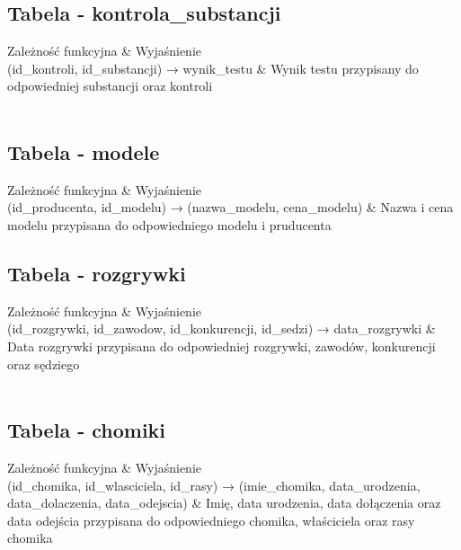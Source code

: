 \documentclass{article}
\begin{document}
\subsection{Tabela - kontrola\_substancji}

\begin{tcolorbox}[tab2,tabularx={X||X}]
Zależność funkcyjna & Wyjaśnienie     \\
\hline
\hline
(id\_kontroli, id\_substancji) → wynik\_testu & Wynik testu przypisany do odpowiedniej substancji oraz kontroli \\  \\    
\end{tcolorbox}

\subsection{Tabela - modele}

\begin{tcolorbox}[tab2,tabularx={X||X}]
Zależność funkcyjna & Wyjaśnienie     \\
\hline
\hline
(id\_producenta, id\_modelu) → (nazwa\_modelu, cena\_modelu) & Nazwa i cena modelu przypisana do odpowiedniego modelu i pruducenta \\ 
\end{tcolorbox}

\subsection{Tabela - rozgrywki}

\begin{tcolorbox}[tab2,tabularx={X||X}]
Zależność funkcyjna & Wyjaśnienie     \\
\hline
\hline
(id\_rozgrywki, id\_zawodow, id\_konkurencji, id\_sedzi) → data\_rozgrywki & Data rozgrywki przypisana do odpowiedniej rozgrywki, zawodów, konkurencji oraz sędziego\\  \\    
\end{tcolorbox}

\subsection{Tabela - chomiki}

\begin{tcolorbox}[tab2,tabularx={X||X}]
Zależność funkcyjna & Wyjaśnienie     \\
\hline
\hline
(id\_chomika, id\_wlasciciela, id\_rasy) → (imie\_chomika, data\_urodzenia, data\_dolaczenia, data\_odejscia) & Imię, data urodzenia, data dołączenia oraz data odejścia przypisana do odpowiedniego chomika, właściciela oraz rasy chomika \\  \\    
\end{tcolorbox}
\end{document}

